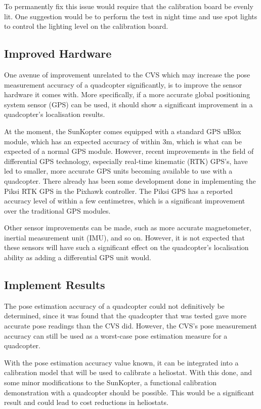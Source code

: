 To permanently fix this issue would require that the calibration board be evenly lit. One suggestion would be to perform the test in night time and use spot lights to control the lighting level on the calibration board. 

\subsection{Improved Hardware}

One avenue of improvement unrelated to the CVS which may increase the pose measurement accuracy of a quadcopter significantly, is to improve the sensor hardware it comes with. More specifically, if a more accurate global positioning system sensor (GPS) can be used, it should show a significant improvement in a quadcopter's localisation results. 

At the moment, the SunKopter comes equipped with a standard GPS uBlox module, which has an expected accuracy of within 3m, which is what can be expected of a normal GPS module. However, recent improvements in the field of differential GPS technology, especially real-time kinematic (RTK) GPS's, have led to smaller, more accurate GPS units becoming available to use with a quadcopter. There already has been some development done in implementing the Piksi RTK GPS in the Pixhawk controller. The Piksi GPS has a reported accuracy level of within a few centimetres, which is a significant improvement over the traditional GPS modules. 

Other sensor improvements can be made, such as more accurate magnetometer, inertial measurement unit (IMU), and so on. However, it is not expected that these sensors will have such a significant effect on the quadcopter's localisation ability as adding a differential GPS unit would. 

\subsection{Implement Results}

The pose estimation accuracy of a quadcopter could not definitively be determined, since it was found that the quadcopter that was tested gave more accurate pose readings than the CVS did. However, the CVS's pose measurement accuracy can still be used as a worst-case pose estimation measure for a quadcopter. 

With the pose estimation accuracy value known, it can be integrated into a calibration model that will be used to calibrate a heliostat. With this done, and some minor modifications to the SunKopter, a functional calibration demonstration with a quadcopter should be possible. This would be a significant result and could lead to cost reductions in heliostats. 


